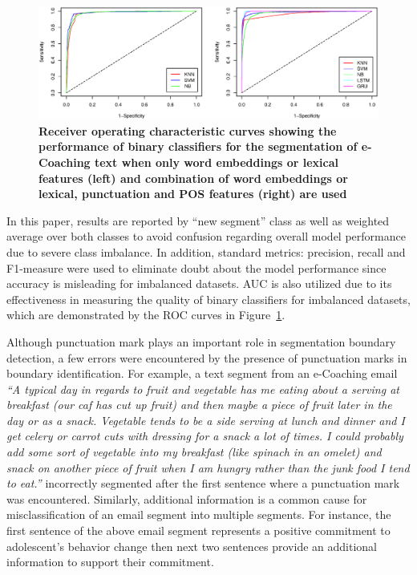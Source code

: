 \documentclass{amia}
\begin{document}
\begin{figure}[!htb]
    \centering
    \includegraphics[width=1.0\textwidth]{figures/roc-curves.eps}
    \caption{\textbf{Receiver operating characteristic curves showing the performance of binary classifiers for the segmentation of e-Coaching text when only word embeddings or lexical features (left) and combination of word embeddings or lexical, punctuation and POS features (right) are used}}
    \label{fig:roc-curves}
\end{figure}

In this paper, results are reported by ``new segment'' class as well as weighted average over both classes to avoid confusion regarding overall model performance due to severe class imbalance. In addition, standard metrics: precision, recall and F1-measure were used to eliminate doubt about the model performance since accuracy is misleading for imbalanced datasets. AUC is also utilized due to its effectiveness in measuring the quality of binary classifiers for imbalanced datasets,\cite{hu2015kernelized} which are demonstrated by the ROC curves in Figure~\ref{fig:roc-curves}. 

Although punctuation mark plays an important role in segmentation boundary detection, a few errors were encountered by the presence of punctuation marks in boundary identification. For example, a text segment from an e-Coaching email \textit{``A typical day in regards to fruit and vegetable has me eating about a serving at breakfast (our caf has cut up fruit) and then maybe a piece of fruit later in the day or as a snack. Vegetable tends to be a side serving at lunch and dinner and I get celery or carrot cuts with dressing for a snack a lot of times. I could probably add some sort of vegetable into my breakfast (like spinach in an omelet) and snack on another piece of fruit when I am hungry rather than the junk food I tend to eat.''} incorrectly segmented after the first sentence where a punctuation mark was encountered. Similarly, additional information is a common cause for misclassification of an email segment into multiple segments. For instance, the first sentence of the above email segment represents a positive commitment to adolescent's behavior change then next two sentences provide an additional information to support their commitment. 
\end{document}
